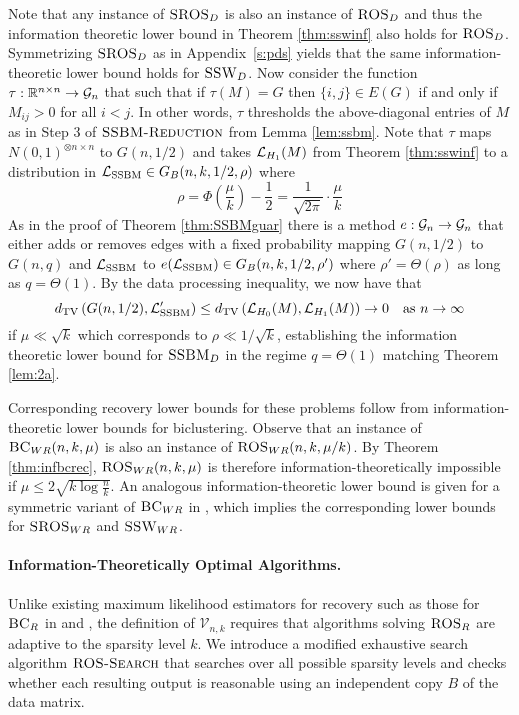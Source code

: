 Note that any instance of $\textsc{SROS}_D$ is also an instance of $\textsc{ROS}_D$ and thus the information theoretic lower bound in Theorem \ref{thm:sswinf} also holds for $\textsc{ROS}_D$. Symmetrizing $\textsc{SROS}_D$ as in Appendix~\ref{s:pds} yields that the same information-theoretic lower bound holds for $\textsc{SSW}_D$. Now consider the function $\tau : \mathbb{R}^{n \times n} \to \mathcal{G}_n$ that such that if $\tau(M) = G$ then $\{i, j\} \in E(G)$ if and only if $M_{ij} > 0$ for all $i < j$. In other words, $\tau$ thresholds the above-diagonal entries of $M$ as in Step 3 of $\textsc{SSBM-Reduction}$ from Lemma \ref{lem:ssbm}. Note that $\tau$ maps $N(0, 1)^{\otimes n \times n}$ to $G(n, 1/2)$ and takes $\mathcal{L}_{H_1}(M)$ from Theorem \ref{thm:sswinf} to a distribution in $\mathcal{L}_{\text{SSBM}} \in G_B(n, k, 1/2, \rho)$ where
$$\rho = \Phi\left(\frac{\mu}{k} \right) - \frac{1}{2} = \frac{1}{\sqrt{2\pi}} \cdot \frac{\mu}{k}$$
As in the proof of Theorem \ref{thm:SSBMguar} there is a method $e : \mathcal{G}_n \to \mathcal{G}_n$ that either adds or removes edges with a fixed probability mapping $G(n, 1/2)$ to $G(n, q)$ and $\mathcal{L}_{\text{SSBM}}$ to $e(\mathcal{L}_{\text{SSBM}}) \in G_B(n, k, 1/2, \rho')$ where $\rho' = \Theta(\rho)$ as long as $q = \Theta(1)$. By the data processing inequality, we now have that
$$d_{\text{TV}}\left( G(n, 1/2), \mathcal{L}_{\text{SSBM}}'\right) \le d_{\text{TV}}\left( \mathcal{L}_{H_0}(M), \mathcal{L}_{H_1}(M) \right) \to 0 \quad \text{as } n \to \infty$$
if $\mu \ll \sqrt{k}$ which corresponds to $\rho \ll 1/\sqrt{k}$, establishing the information theoretic lower bound for $\textsc{SSBM}_D$ in the regime $q = \Theta(1)$ matching Theorem \ref{lem:2a}.

Corresponding recovery lower bounds for these problems follow from information-theoretic lower bounds for biclustering. Observe that an instance of $\textsc{BC}_{WR}(n, k, \mu)$ is also an instance of $\textsc{ROS}_{WR}(n, k, \mu/k)$. By Theorem \ref{thm:infbcrec}, $\textsc{ROS}_{WR}(n, k, \mu)$ is therefore information-theoretically impossible if $\mu \le 2\sqrt{k \log \frac{n}{k}}$. An analogous information-theoretic lower bound is given for a symmetric variant of $\textsc{BC}_{WR}$ in \cite{hajek2016information}, which implies the corresponding lower bounds for $\textsc{SROS}_{WR}$ and $\textsc{SSW}_{WR}$.

\paragraph{Information-Theoretically Optimal Algorithms.} Unlike existing maximum likelihood estimators for recovery such as those for $\textsc{BC}_R$ in \cite{chen2016statistical} and \cite{cai2015computational}, the definition of $\mathcal{V}_{n, k}$ requires that algorithms solving $\textsc{ROS}_R$ are adaptive to the sparsity level $k$. We introduce a modified exhaustive search algorithm $\textsc{ROS-Search}$ that searches over all possible sparsity levels and checks whether each resulting output is reasonable using an independent copy $B$ of the data matrix.

